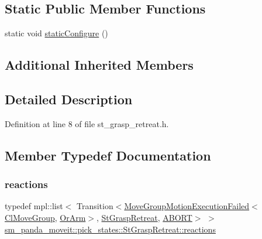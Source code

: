 \subsection*{Static Public Member Functions}
\begin{DoxyCompactItemize}
\item 
static void \hyperlink{structsm__panda__moveit_1_1pick__states_1_1StGraspRetreat_a955fabf7ca574e03e9c9ff8c0b757a6a}{static\+Configure} ()
\end{DoxyCompactItemize}
\subsection*{Additional Inherited Members}


\subsection{Detailed Description}


Definition at line 8 of file st\+\_\+grasp\+\_\+retreat.\+h.



\subsection{Member Typedef Documentation}
\mbox{\label{structsm__panda__moveit_1_1pick__states_1_1StGraspRetreat_a0c4d86449d4a57024ef535c98d3028e1}} 
\subsubsection{\texorpdfstring{reactions}{reactions}}
{\footnotesize\ttfamily typedef mpl\+::list$<$ Transition$<$\hyperlink{structmoveit__z__client_1_1MoveGroupMotionExecutionFailed}{Move\+Group\+Motion\+Execution\+Failed}$<$\hyperlink{classmoveit__z__client_1_1ClMoveGroup}{Cl\+Move\+Group}, \hyperlink{classsm__panda__moveit_1_1OrArm}{Or\+Arm}$>$, \hyperlink{structsm__panda__moveit_1_1pick__states_1_1StGraspRetreat}{St\+Grasp\+Retreat}, \hyperlink{classABORT}{A\+B\+O\+RT}$>$ $>$ \hyperlink{structsm__panda__moveit_1_1pick__states_1_1StGraspRetreat_a0c4d86449d4a57024ef535c98d3028e1}{sm\+\_\+panda\+\_\+moveit\+::pick\+\_\+states\+::\+St\+Grasp\+Retreat\+::reactions}}




